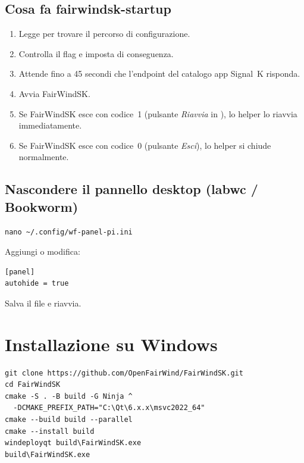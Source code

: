 \subsection{Cosa fa fairwindsk-startup}

\begin{enumerate}
  \item Legge  per trovare il percorso di configurazione.
  \item Controlla il flag  e imposta 
        di conseguenza.
  \item Attende fino a 45 secondi che l'endpoint del catalogo app Signal~K risponda.
  \item Avvia FairWindSK.
  \item Se FairWindSK esce con codice~1 (pulsante \textit{Riavvia} in
        ), lo helper lo riavvia immediatamente.
  \item Se FairWindSK esce con codice~0 (pulsante \textit{Esci}),
        lo helper si chiude normalmente.
\end{enumerate}

\subsection{Nascondere il pannello desktop (labwc / Bookworm)}

\begin{lstlisting}
nano ~/.config/wf-panel-pi.ini
\end{lstlisting}

Aggiungi o modifica:

\begin{lstlisting}
[panel]
autohide = true
\end{lstlisting}

Salva il file e riavvia.

\section{Installazione su Windows}
\label{app:windows}

\begin{lstlisting}
git clone https://github.com/OpenFairWind/FairWindSK.git
cd FairWindSK
cmake -S . -B build -G Ninja ^
  -DCMAKE_PREFIX_PATH="C:\Qt\6.x.x\msvc2022_64"
cmake --build build --parallel
cmake --install build
windeployqt build\FairWindSK.exe
build\FairWindSK.exe
\end{lstlisting}

